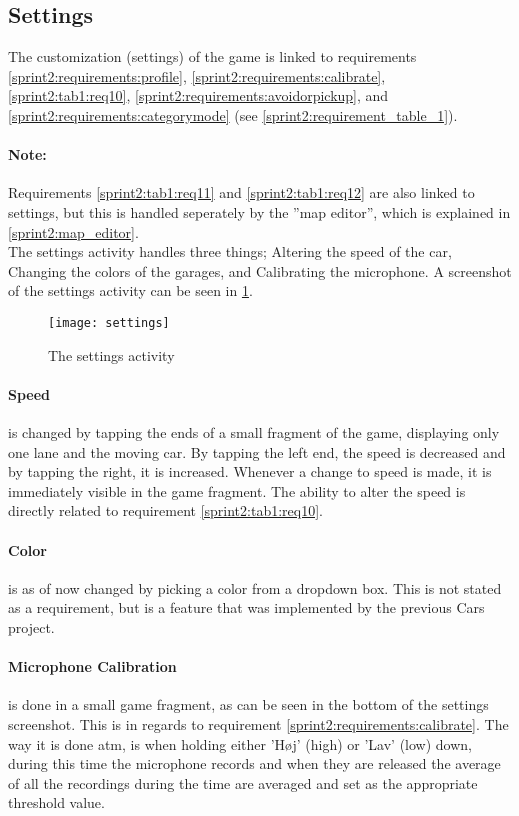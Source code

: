 \subsection{Settings}

The customization (settings) of the game is linked to requirements \ref{sprint2:requirements:profile}, \ref{sprint2:requirements:calibrate}, \ref{sprint2:tab1:req10}, \ref{sprint2:requirements:avoidorpickup}, and \ref{sprint2:requirements:categorymode} (see \cref{sprint2:requirement_table_1}).

\paragraph{Note:} Requirements \ref{sprint2:tab1:req11} and \ref{sprint2:tab1:req12} are also linked to settings, but this is handled seperately by the ''map editor'', which is explained in \cref{sprint2:map_editor}.\\

\noindent
The settings activity handles three things; Altering the speed of the car, Changing the colors of the garages, and Calibrating the microphone.
A screenshot of the settings activity can be seen in \cref{sprint2:settings:fig}.
\begin{center}
\begin{figure}
\texttt{[image: settings]}
\caption{The settings activity}
\label{sprint2:settings:fig}
\end{figure}
\end{center}
\paragraph{Speed} is changed by tapping the ends of a small fragment of the game, displaying only one lane and the moving car.
By tapping the left end, the speed is decreased and by tapping the right, it is increased.
Whenever a change to speed is made, it is immediately visible in the game fragment.
The ability to alter the speed is directly related to requirement \ref{sprint2:tab1:req10}.

\paragraph{Color} is as of now changed by picking a color from a dropdown box.
This is not stated as a requirement, but is a feature that was implemented by the previous Cars project.

\paragraph{Microphone Calibration} is done in a small game fragment, as can be seen in the bottom of the settings screenshot.
This is in regards to requirement \ref{sprint2:requirements:calibrate}.
The way it is done atm, is when holding either 'H\o j' (high) or 'Lav' (low) down, during this time the microphone records and when they are released the average of all the recordings during the time are averaged and set as the appropriate threshold value.


